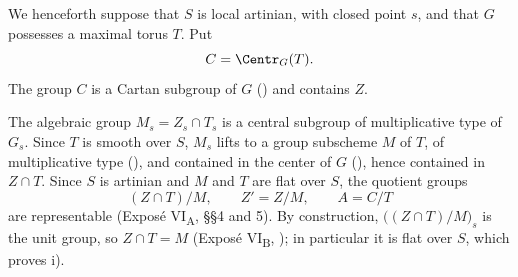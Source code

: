 We henceforth suppose that \(S\) is local artinian, with closed
point \(s\), and that \(G\) possesses a maximal torus \(T\). Put
\[
  C=\Centr_G(T).
\]
The group \(C\) is a Cartan subgroup of \(G\) ()
and contains \(Z\).

The algebraic group \(M_s=Z_s\cap T_s\) is a central subgroup of
multiplicative type of \(G_s\). Since \(T\) is smooth over \(S\),
\(M_s\) lifts to a group subscheme \(M\) of \(T\), of
multiplicative type (), and contained in the
center of \(G\) (), hence contained in \(Z\cap T\).
Since \(S\) is artinian and \(M\) and \(T\) are flat over \(S\),
the quotient groups
\[
  (Z\cap T)/M,\qquad Z'=Z/M,\qquad A=C/T
\]
are representable (Exposé VI\textsubscript{A}, \S\S4 and 5).
By construction, \(\bigl((Z\cap T)/M\bigr)_s\) is the unit group,
so \(Z\cap T=M\) (Exposé VI\textsubscript{B}, ); in
particular it is flat over \(S\), which proves  i).

